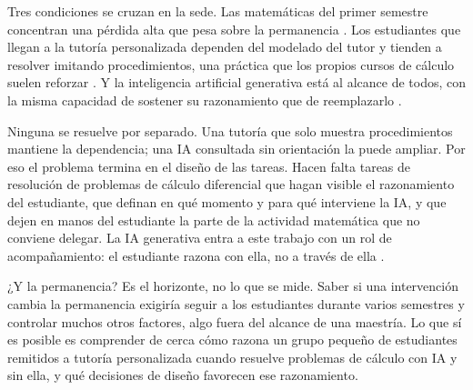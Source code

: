 Tres condiciones se cruzan en la sede. Las matemáticas del primer semestre concentran una pérdida alta que pesa sobre la permanencia \parencite{unal2021gea,men2015permanencia}. Los estudiantes que llegan a la tutoría personalizada dependen del modelado del tutor y tienden a resolver imitando procedimientos, una práctica que los propios cursos de cálculo suelen reforzar \parencite{lithner2004reasoning,biza2016tertiary}. Y la inteligencia artificial generativa está al alcance de todos, con la misma capacidad de sostener su razonamiento que de reemplazarlo \parencite{bastani2025guardrails}.

Ninguna se resuelve por separado. Una tutoría que solo muestra procedimientos mantiene la dependencia; una IA consultada sin orientación la puede ampliar. Por eso el problema termina en el diseño de las tareas. Hacen falta tareas de resolución de problemas de cálculo diferencial que hagan visible el razonamiento del estudiante, que definan en qué momento y para qué interviene la IA, y que dejen en manos del estudiante la parte de la actividad matemática que no conviene delegar. La IA generativa entra a este trabajo con un rol de acompañamiento: el estudiante razona con ella, no a través de ella \parencite{ouyang2021paradigms,font2022qedtutrix}.

¿Y la permanencia? Es el horizonte, no lo que se mide. Saber si una intervención cambia la permanencia exigiría seguir a los estudiantes durante varios semestres y controlar muchos otros factores, algo fuera del alcance de una maestría. Lo que sí es posible es comprender de cerca cómo razona un grupo pequeño de estudiantes remitidos a tutoría personalizada cuando resuelve problemas de cálculo con IA y sin ella, y qué decisiones de diseño favorecen ese razonamiento.
